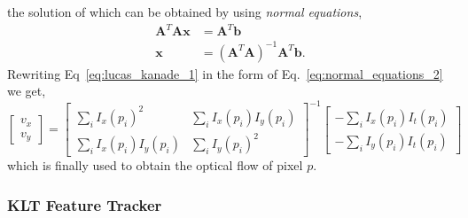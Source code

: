 %
the solution of which can be obtained by using \textit{normal equations},
%
\begin{align}
  \label{eq:normal_equations_1}
  \mathbf{A}^{T} \mathbf{A} \mathbf{x} &= \mathbf{A}^{T} \mathbf{b} \\
  \label{eq:normal_equations_2}
  \mathbf{x} &= (\mathbf{A}^{T} \mathbf{A})^{-1} \mathbf{A}^{T} \mathbf{b}.
\end{align}
%
Rewriting Eq~\ref{eq:lucas_kanade_1} in the form of Eq.~\ref{eq:normal_equations_2} we get,
%
\begin{equation}
  \begin{bmatrix}
  v_{x} \\ v_{y}
  \end{bmatrix}
  =
  \begin{bmatrix}
    \sum_{i}{I_{x}(p_{i})}^2 & \sum_{i}{I_{x}(p_{i}) I_{y}(p_{i}) } \\ 
    \sum_{i}{I_{x}(p_{i}) I_{y}(p_{i})} & \sum_{i}{I_{y}(p_{i})}^2
  \end{bmatrix}^{-1}
  \begin{bmatrix}
    - \sum_{i}{I_{x}(p_{i}) I_{t}(p_{i})} \\ 
    - \sum_{i}{I_{y}(p_{i}) I_{t}(p_{i})}
  \end{bmatrix}
\end{equation}
%
which is finally used to obtain the optical flow of pixel $p$.



\subsubsection{KLT Feature Tracker}

